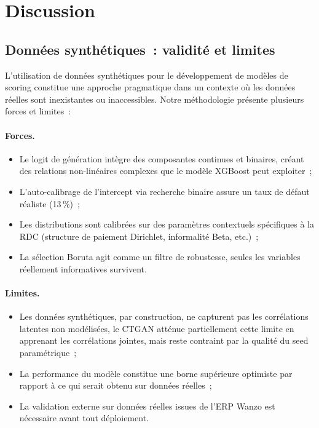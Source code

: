 \documentclass[12pt, a4paper, twocolumn]{article}
\begin{document}
\section{Discussion}
\label{sec:discussion}

\subsection{Données synthétiques~: validité et limites}
\label{subsec:discuss_synth}

L'utilisation de données synthétiques pour le développement de modèles de scoring constitue une approche pragmatique dans un contexte où les données réelles sont inexistantes ou inaccessibles. Notre méthodologie présente plusieurs forces et limites~:

\paragraph{Forces.}
\begin{itemize}[leftmargin=*]
  \item Le logit de génération intègre des composantes continues et binaires, créant des relations non-linéaires complexes que le modèle XGBoost peut exploiter~;
  \item L'auto-calibrage de l'intercept via recherche binaire assure un taux de défaut réaliste (13\,\%)~;
  \item Les distributions sont calibrées sur des paramètres contextuels spécifiques à la RDC (structure de paiement Dirichlet, informalité Beta, etc.)~;
  \item La sélection Boruta agit comme un filtre de robustesse, seules les variables réellement informatives survivent.
\end{itemize}

\paragraph{Limites.}
\begin{itemize}[leftmargin=*]
  \item Les données synthétiques, par construction, ne capturent pas les corrélations latentes non modélisées, le CTGAN atténue partiellement cette limite en apprenant les corrélations jointes, mais reste contraint par la qualité du seed paramétrique~;
  \item La performance du modèle constitue une borne supérieure optimiste par rapport à ce qui serait obtenu sur données réelles~;
  \item La validation externe sur données réelles issues de l'ERP Wanzo est nécessaire avant tout déploiement.
\end{itemize}
\end{document}
